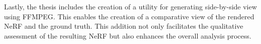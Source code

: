 Lastly, the thesis includes the creation of a utility for generating side-by-side view using FFMPEG\cite{tomar2006converting}. This enables the creation of a comparative view of the rendered NeRF and the ground truth. This addition not only facilitates the qualitative assessment of the resulting NeRF but also enhances the overall analysis process.

\begin{comment}
\begin{itemize}
    \item Pipeline from CARLA to Nerfstudio
    \begin{itemize}
        \item Enables experimenting with data capture techniques that can later be applied to real world scenarios.
        \item Enables running multiple experiments with different experiment settings, e.g. camera setup, vehicle speed, route, image resolution, etc., in a streamlined way.
        \item The data output from the experiment-pipeline in CARLA is in a format supported by most NeRFs. Enables training NeRFs on the synthetic data captured in CARLA, and, based on the evaluation of the NeRF, tweak settings to improve the resulting image synthesis.
    \end{itemize}
    \item A baseline for NeRFs trained on synthetic data captured in CARLA. 
    \begin{itemize}
        \item Can be used to further improve both the data capture and the NeRF-models on synthetic data.
        \item Can be used to experiment with data capture- and NeRF-settings.
        \item The metrics used to evaluate the baseline (PSNR, SSIM and LPIPS) are widely used throughout NeRF-research and makes comparable.
    \end{itemize}
    \item Block-NeRF in Nerfstudio API
    \begin{itemize}
        \item Creates a naive Block-NeRF implementation with the Nerfstudio API, demonstrating how such an approach can substantially increase the quality of large scene NeRFs.
        \item The PoC allows testing which parameters are important when capturing large-scale data for NeRFs. E.g. the segment size, overlap between the blocks, and image merging techniques.
    \end{itemize}
    \item Side-by-side view
    \begin{itemize}
        \item Leverage FFMPEG to create a script for generating side-by-side views of the rendered NeRF and the ground truth.
        \item Makes qualitative assessment of the resulting NeRF easier.
    \end{itemize}
\end{itemize}

\end{comment}
